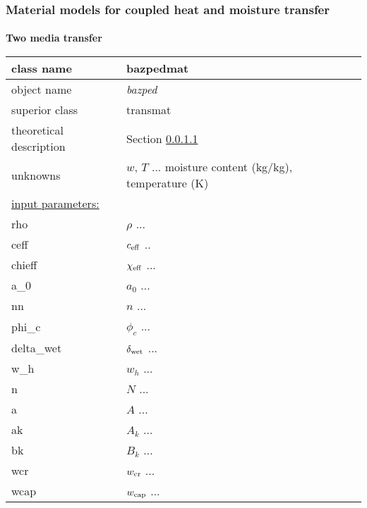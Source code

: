 \subsubsection{Material models for coupled heat and moisture transfer}

\paragraph{}{\bf Two media transfer}


\begin{center}
\begin{tabular}{|l|l|}
\hline
class name & {\sf bazpedmat}\index{class!{\sf bazpedmat}}
\\ \hline
object name & {\it bazped}\index{instance!{\it bazantpedersen}}
\\ \hline
superior class & {\sf transmat}
\\ \hline
theoretical description & Section \ref{}
\\ \hline
unknowns & $w$, $T$ ... moisture content (kg/kg), temperature (K)
\\ \hline
\underline{input parameters:}  & 
\\ rho & $\rho$ ...  
\\ ceff & $c_{\rm eff}$ .. 
\\ chieff & $\chi_{\rm eff}$ ... 
\\ a\_0 & $a_0$ ... 
\\ nn & $n$ ... 
\\ phi\_c & $\phi_c$ ... 
\\ delta\_wet & $\delta_{\rm wet}$ ... 
\\ w\_h & $w_h$ ... 
\\ n & $N$ ... 
\\ a & $A$ ... 
\\ ak & $A_k$ ... 
\\ bk & $B_k$ ... 
\\ wcr & $w_{\rm cr}$ ... 
\\ wcap & $w_{\rm cap}$ ... 
\\ \hline
\end{tabular}
\end{center}



